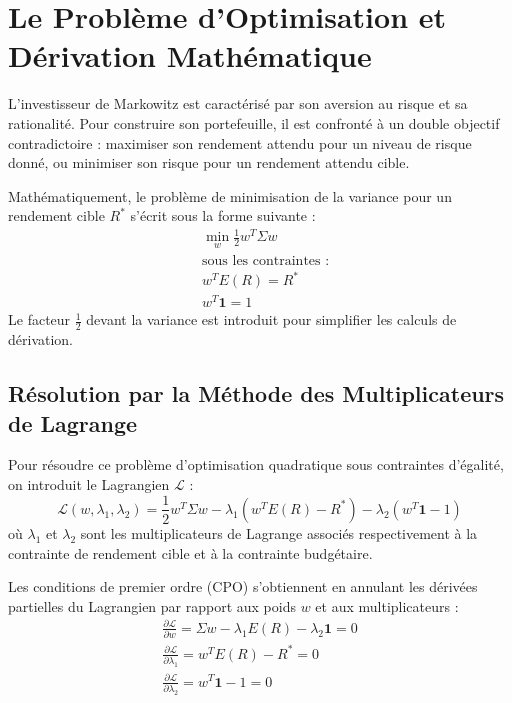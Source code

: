 \section{Le Problème d'Optimisation et Dérivation Mathématique}
L'investisseur de Markowitz est caractérisé par son aversion au risque et sa rationalité. Pour construire son portefeuille, il est confronté à un double objectif contradictoire : maximiser son rendement attendu pour un niveau de risque donné, ou minimiser son risque pour un rendement attendu cible.

Mathématiquement, le problème de minimisation de la variance pour un rendement cible $R^*$ s'écrit sous la forme suivante :
\begin{equation}
    \begin{aligned}
        & \min_{w} \frac{1}{2} w^T \Sigma w \\
        & \text{sous les contraintes :} \\
        & w^T E(R) = R^* \\
        & w^T \mathbf{1} = 1
    \end{aligned}
\end{equation}
Le facteur $\frac{1}{2}$ devant la variance est introduit pour simplifier les calculs de dérivation.

\subsection{Résolution par la Méthode des Multiplicateurs de Lagrange}
Pour résoudre ce problème d'optimisation quadratique sous contraintes d'égalité, on introduit le Lagrangien $\mathcal{L}$ :
\begin{equation}
    \mathcal{L}(w, \lambda_1, \lambda_2) = \frac{1}{2} w^T \Sigma w - \lambda_1 (w^T E(R) - R^*) - \lambda_2 (w^T \mathbf{1} - 1)
\end{equation}
où $\lambda_1$ et $\lambda_2$ sont les multiplicateurs de Lagrange associés respectivement à la contrainte de rendement cible et à la contrainte budgétaire.

Les conditions de premier ordre (CPO) s'obtiennent en annulant les dérivées partielles du Lagrangien par rapport aux poids $w$ et aux multiplicateurs :
\begin{align}
    \frac{\partial \mathcal{L}}{\partial w} = \Sigma w - \lambda_1 E(R) - \lambda_2 \mathbf{1} = 0 \\
    \frac{\partial \mathcal{L}}{\partial \lambda_1} = w^T E(R) - R^* = 0 \\
    \frac{\partial \mathcal{L}}{\partial \lambda_2} = w^T \mathbf{1} - 1 = 0
\end{align}

